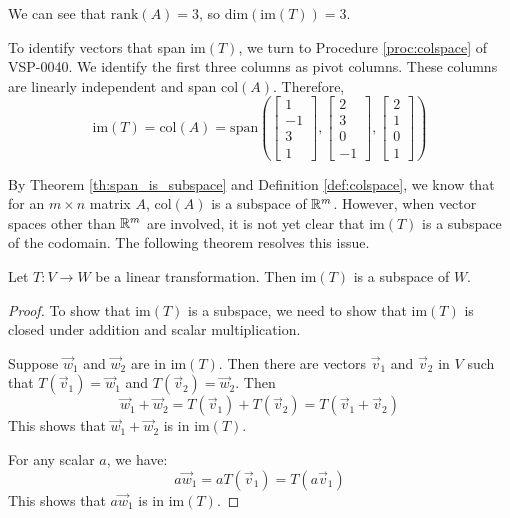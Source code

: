 \documentclass{ximera}
\begin{document}
\begin{example}
\begin{explanation}
We can see that $\mbox{rank}(A)=3$, so $\mbox{dim}(\mbox{im}(T))=3$.  

To identify vectors that span $\mbox{im}(T)$, we turn to Procedure \ref{proc:colspace} of VSP-0040.  We identify the first three columns as pivot columns.  These columns are linearly independent and span $\mbox{col}(A)$.  Therefore,
$$\mbox{im}(T)=\mbox{col}(A)=\mbox{span}\left(\begin{bmatrix}1\\-1\\3\\1\end{bmatrix}, \begin{bmatrix}2\\3\\0\\-1\end{bmatrix}, \begin{bmatrix}2\\1\\0\\1\end{bmatrix}\right)$$
\end{explanation}
\end{example}

By Theorem \ref{th:span_is_subspace} and Definition \ref{def:colspace}, we know that for an $m\times n$ matrix $A$, $\mbox{col}(A)$ is a subspace of $\mathbb{R}^m$.  However, when vector spaces other than $\mathbb{R}^m$ are involved, it is not yet clear that $\mbox{im}(T)$ is a subspace of the codomain. The following theorem resolves this issue.

\begin{theorem}\label{th:imagesubspace}
Let $T:V\rightarrow W$ be a linear transformation.  Then $\mbox{im}(T)$ is a subspace of $W$.
\end{theorem}
\begin{proof}
To show that $\mbox{im}(T)$ is a subspace, we need to show that $\mbox{im}(T)$ is closed under addition and scalar multiplication.

Suppose $\vec{w}_1$ and $\vec{w}_2$ are in $\mbox{im}(T)$.  Then there are vectors $\vec{v}_1$ and $\vec{v}_2$ in $V$ such that $T(\vec{v}_1)=\vec{w}_1$ and $T(\vec{v}_2)=\vec{w}_2$.  Then
$$\vec{w}_1+\vec{w}_2=T(\vec{v}_1)+T(\vec{v}_2)=T(\vec{v}_1+\vec{v}_2)$$
This shows that $\vec{w}_1+\vec{w}_2$ is in $\mbox{im}(T)$.

For any scalar $a$, we have:
$$a\vec{w}_1=aT(\vec{v}_1)=T(a\vec{v}_1)$$
This shows that $a\vec{w}_1$ is in $\mbox{im}(T)$.

\end{proof}
\end{document}
